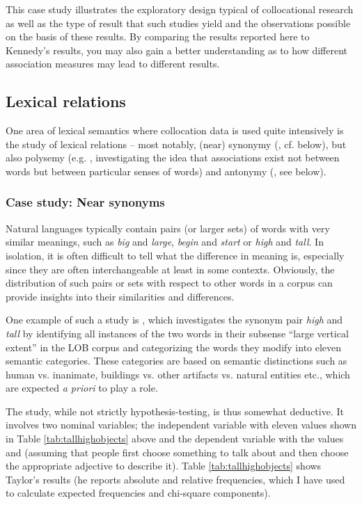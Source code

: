This case study illustrates the exploratory design typical of collocational research as well as the type of result that such studies yield and the observations possible on the basis of these results. By comparing the results reported here to Kennedy's results, you may also gain a better understanding as to how different association measures may lead to different results.

\subsection{Lexical relations}
\label{sec:lexicalrelations}

One area of lexical semantics where collocation data is used quite intensively is the study of lexical relations -- most notably, (near) synonymy (\citet{taylor_near_2003}, cf. below), but also polysemy (e.g. \citet{yarowsky_one_1993}, investigating the idea that associations exist not between words but between particular senses of words) and antonymy (\citet{justeson_co-occurrences_1991}, see below).

\subsubsection{Case study: Near synonyms}
\label{sec:nearsynonyms}

Natural languages typically contain pairs (or larger sets) of words with very similar meanings, such as \textit{big} and \textit{large}, \textit{begin} and \textit{start} or \textit{high} and \textit{tall}. In isolation, it is often difficult to tell what the difference in meaning is, especially since they are often interchangeable at least in some contexts. Obviously, the distribution of such pairs or sets with respect to other words in a corpus can provide insights into their similarities and differences.

One example of such a study is \citet{taylor_near_2003}, which investigates the synonym pair \textit{high} and \textit{tall} by identifying all instances of the two words in their subsense ``large vertical extent'' in the LOB corpus and categorizing the words they modify into eleven semantic categories. These categories are based on semantic distinctions such as human vs. inanimate, buildings vs. other artifacts vs. natural entities etc., which are expected \textit{a priori} to play a role.

The study, while not strictly hypothesis-testing, is thus somewhat deductive. It involves two nominal variables; the independent variable  with eleven values shown in Table \ref{tab:tallhighobjects} above and the dependent variable  with the values  and  (assuming that people first choose something to talk about and then choose the appropriate adjective to describe it). Table \ref{tab:tallhighobjects} shows Taylor's results (he reports absolute and relative frequencies, which I have used to calculate expected frequencies and chi-square components).

